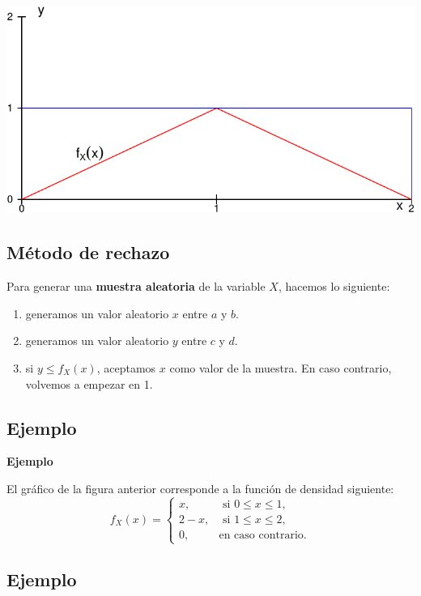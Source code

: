 \documentclass[]{book}
\begin{document}
\includegraphics{curso-probabilidad-udemy_files/figure-latex/unnamed-chunk-111-1.pdf}

\hypertarget{muxe9todo-de-rechazo-2}{%
\subsection{Método de rechazo}\label{muxe9todo-de-rechazo-2}}

Para generar una \textbf{muestra aleatoria} de la variable \(X\), hacemos lo siguiente:

\begin{enumerate}
\def\labelenumi{\arabic{enumi})}
\item
  generamos un valor aleatorio \(x\) entre \(a\) y \(b\).
\item
  generamos un valor aleatorio \(y\) entre \(c\) y \(d\).
\item
  si \(y\leq f_X(x)\), aceptamos \(x\) como valor de la muestra. En caso contrario, volvemos a empezar en 1.
\end{enumerate}

\hypertarget{ejemplo-32}{%
\subsection{Ejemplo}\label{ejemplo-32}}

\textbf{Ejemplo}

El gráfico de la figura anterior corresponde a la función de densidad siguiente:
\[
f_X(x)=\begin{cases}
x, & \mbox{ si }0\leq x\leq 1,\\
2-x, & \mbox{ si }1\leq x\leq 2,\\
0, & \mbox{en caso contrario.}
\end{cases}
\]

\hypertarget{ejemplo-33}{%
\subsection{Ejemplo}\label{ejemplo-33}}
\end{document}

